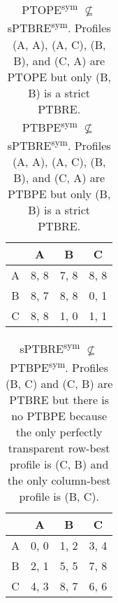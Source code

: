 \begin{table}
	\caption{
		\\PTOPE\textsuperscript{sym} $\not\subseteq$ sPTBRE\textsuperscript{sym}.
		Profiles (A, A), (A, C), (B, B), and (C, A) are PTOPE but only (B, B) is a strict PTBRE.\vspace{5pt}\\
		PTBPE\textsuperscript{sym} $\not\subseteq$ sPTBRE\textsuperscript{sym}.
		Profiles (A, A), (A, C), (B, B), and (C, A) are PTBPE but only (B, B) is a strict PTBRE.
	}
	\label{tab:PTOPE-not-sub-sptbre}
	\label{tab:ptbpe-not-sub-sptbre}
	\centering
	\begin{tabular}{|c|c|c|c|}
		\hline
			& A		& B	   & C	  \\
		\hline
		A 		&\cellcolor{gray!00} 8, 8 &\cellcolor{gray!20} 7, 8 &\cellcolor{gray!00} 8, 8 \\
		\hline
		B		&\cellcolor{gray!20} 8, 7 &\cellcolor{gray!00} 8, 8 &\cellcolor{gray!70} 0, 1 \\
		\hline
		C		&\cellcolor{gray!00} 8, 8 &\cellcolor{gray!70} 1, 0 &\cellcolor{gray!70} 1, 1 \\
		\hline
	\end{tabular}
\end{table}

\begin{table}
	\caption{
		sPTBRE\textsuperscript{sym} $\not\subseteq$ PTBPE\textsuperscript{sym}.
		Profiles (B, C) and (C, B) are PTBRE but there is no PTBPE because the only perfectly transparent row-best profile is (C, B) and the only column-best profile is (B, C).
	}
	\label{tab:ptbre-not-sub-ptbpe}
	\centering
	\begin{tabular}{|c|c|c|c|}
		\hline
			& A		& B	   & C	  \\
		\hline
		A 		&\cellcolor{gray!80} 0, 0 &\cellcolor{gray!80} 1, 2 &\cellcolor{gray!80} 3, 4 \\
		\hline
		B		&\cellcolor{gray!80} 2, 1 &\cellcolor{gray!60} 5, 5 &\cellcolor{gray!40} 7, 8 \\
		\hline
		C		&\cellcolor{gray!80} 4, 3 &\cellcolor{gray!40} 8, 7 &\cellcolor{gray!20} 6, 6 \\
		\hline
	\end{tabular}
\end{table}


